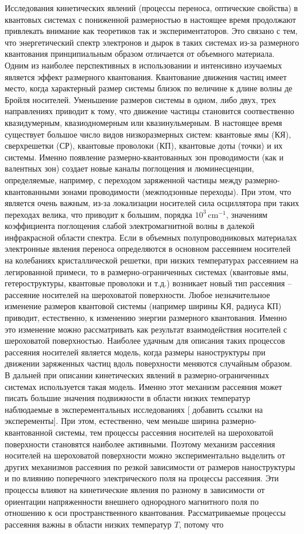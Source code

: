 {\actuality} Исследования кинетических явлений (процессы переноса, оптические свойства) в квантовых системах с пониженной размерностью в настоящее время продолжают привлекать внимание как теоретиков так и экспериментаторов. Это связано с тем, что энергетический спектр электронов и дырок в таких системах из-за размерного квантования принципиальным образом отличается от объемного материала. Одним из наиболее перспективных в использовании и интенсивно изучаемых является эффект размерного квантования. Квантование движения частиц имеет место, когда характерный размер системы близок по величине к длине волны де Бройля носителей. Уменьшение размеров системы в одном, либо двух, трех направлениях приводит к тому, что движение частицы становится соотвественно квазидумерным, квазиодномерным или квазинульмерным. В настоящее время существует большое число видов низкоразмерных систем: квантовые ямы (КЯ), сверхрешетки (СР), квантовые проволоки (КП), квантовые доты (точки) и их системы. Именно появление размерно-квантованных зон проводимости (как и валентных зон) создает новые каналы поглощения и люминесценции, определяемые, например, с переходом заряженной частицы между размерно-квантованными зонами проводимости (межподзонные переходы). При этом, что является очень важным, из-за локализации носителей сила осциллятора при таких переходах велика, что приводит к большим, порядка $10^3\,\text{cm}^{-1}$, значениям коэффициента поглощения слабой электромагнитной волны в далекой инфракрасной области спектра. Если в объемных полупроводниковых материалах электронные явления переноса определяются в основном рассеянием носителей на колебаниях кристаллической решетки, при низких температурах рассеянием на легированной примеси, то в размерно-ограниченных системах (квантовые ямы, гетероструктуры, квантовые проволоки и т.д.) возникает новый тип рассеяния – рассеяние носителей на шероховатой поверхности. Любое незначительное изменение размеров квантовой системы (например ширины КЯ, радиуса КП) приводит, естественно, к изменению энергии размерного квантования. Именно это изменение можно рассматривать как результат взаимодействия носителей с шероховатой поверхностью. Наиболее удачным для описания таких процессов рассеяния носителей является модель, когда размеры наноструктуры при движении заряженных частиц вдоль поверхности меняются случайным образом. В дальней при описании кинетических явлений в размерно-ограниченных системах используется такая модель. Именно этот механизм рассеяния может писать большие значения подвижности в области низких температур наблюдаемые в эксперементальных исследованиях {[\color{red} добавить ссылки на эксперементы]}. При этом, естественно, чем меньше ширина размерно-квантованной системы, тем процессы рассеяния носителей на шероховатой поверхности становятся наиболее активными. Поэтому механизм рассеяния носителей на шероховатой поверхности можно экспериментально выделить от других механизмов рассеяния по резкой зависимости от размеров наноструктуры и по влиянию поперечного электрического поля на процессы рассеяния. Эти процессы влияют на кинетические явления по разному в зависимости от ориентации напряженности внешнего однородного магнитного поля по отношению к оси пространственного квантования. Рассматриваемые процессы рассеяния важны в области низких температур $T$, потому что 